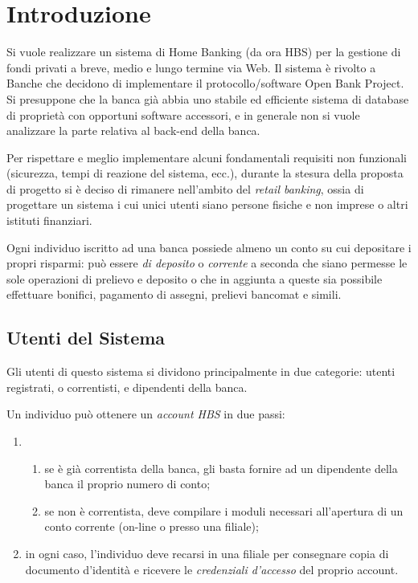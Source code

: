 \section{Introduzione}

Si vuole realizzare un sistema di Home Banking (da ora HBS) per la gestione di fondi privati a breve, medio e lungo termine via Web. Il sistema è rivolto a Banche che decidono di implementare il protocollo/software Open Bank Project. Si presuppone che la banca già abbia uno stabile ed efficiente sistema di database di proprietà con opportuni software accessori, e in generale non si vuole analizzare la parte relativa al back-end della banca.  

Per rispettare e meglio implementare alcuni fondamentali requisiti non funzionali (sicurezza, tempi di reazione del sistema, ecc.), durante la stesura della proposta di progetto si è deciso di rimanere nell'ambito del \emph{retail banking}, ossia di progettare un sistema i cui unici utenti siano persone fisiche e non imprese o altri istituti finanziari.

Ogni individuo iscritto ad una banca possiede almeno un conto su cui depositare i propri risparmi: può essere \emph{di deposito} o \emph{corrente} a seconda che siano permesse le sole operazioni di prelievo e deposito o che in aggiunta a queste sia possibile  effettuare bonifici, pagamento di assegni, prelievi bancomat e simili.

\subsection{Utenti del Sistema}

Gli utenti di questo sistema si dividono principalmente in due categorie: utenti registrati, o correntisti, e dipendenti della banca. 

Un individuo può ottenere un \emph{account HBS} in due passi:
\begin{enumerate}
	\item
	\begin{enumerate}
		\item se è già correntista della banca, gli basta fornire ad un dipendente della banca il proprio numero di conto;
		\item se non è correntista, deve compilare i moduli necessari all'apertura di un conto corrente (on-line o presso una filiale);
	\end{enumerate}
	\item in ogni caso, l'individuo deve recarsi in una filiale per consegnare copia di documento d'identità e ricevere le 					\emph{credenziali d'accesso} del proprio account.
\end{enumerate}

